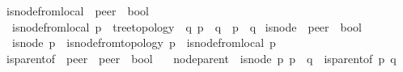 \begin{isabellebody}
\isanewline
{}\isamarkupfalse%
\ is{\isacharunderscore}{\kern0pt}node{\isacharunderscore}{\kern0pt}from{\isacharunderscore}{\kern0pt}local\ {\isacharcolon}{\kern0pt}{\isacharcolon}{\kern0pt}\ {\isachardoublequoteopen}{\isacharprime}{\kern0pt}peer\ {\isasymRightarrow}\ bool{\isachardoublequoteclose}\ \ \isanewline
\ \ {\isachardoublequoteopen}is{\isacharunderscore}{\kern0pt}node{\isacharunderscore}{\kern0pt}from{\isacharunderscore}{\kern0pt}local\ p\ {\isasymequiv}\ tree{\isacharunderscore}{\kern0pt}topology\ {\isasymand}\ {\isacharparenleft}{\kern0pt}{\isasymexists}q{\isachardot}{\kern0pt}\ {\isasymP}\isactrlsub {\isacharquery}{\kern0pt}{\isacharparenleft}{\kern0pt}p{\isacharparenright}{\kern0pt}\ {\isacharequal}{\kern0pt}\ {\isacharbraceleft}{\kern0pt}q{\isacharbraceright}{\kern0pt}\ {\isasymor}\ p\ {\isasymin}\ {\isasymP}\isactrlsub {\isacharbang}{\kern0pt}{\isacharparenleft}{\kern0pt}q{\isacharparenright}{\kern0pt}{\isacharparenright}{\kern0pt}{\isachardoublequoteclose}\isanewline
\isanewline
{}\isamarkupfalse%
\ is{\isacharunderscore}{\kern0pt}node\ {\isacharcolon}{\kern0pt}{\isacharcolon}{\kern0pt}\ {\isachardoublequoteopen}{\isacharprime}{\kern0pt}peer\ {\isasymRightarrow}\ bool{\isachardoublequoteclose}\ \ \isanewline
\ \ {\isachardoublequoteopen}is{\isacharunderscore}{\kern0pt}node\ p\ {\isasymequiv}\ is{\isacharunderscore}{\kern0pt}node{\isacharunderscore}{\kern0pt}from{\isacharunderscore}{\kern0pt}topology\ p\ {\isasymor}\ is{\isacharunderscore}{\kern0pt}node{\isacharunderscore}{\kern0pt}from{\isacharunderscore}{\kern0pt}local\ p{\isachardoublequoteclose}%
\isadelimdocument
%
\endisadelimdocument
%
\isatagdocument
%
\isamarkuptrue%
%
\endisatagdocument
{\isafolddocument}%
%
\isadelimdocument
%
\endisadelimdocument
{}\isamarkupfalse%
\ is{\isacharunderscore}{\kern0pt}parent{\isacharunderscore}{\kern0pt}of\ {\isacharcolon}{\kern0pt}{\isacharcolon}{\kern0pt}\ {\isachardoublequoteopen}{\isacharprime}{\kern0pt}peer\ {\isasymRightarrow}\ {\isacharprime}{\kern0pt}peer\ {\isasymRightarrow}\ bool{\isachardoublequoteclose}\ \isanewline
\ \ node{\isacharunderscore}{\kern0pt}parent\ {\isacharcolon}{\kern0pt}\ {\isachardoublequoteopen}{\isasymlbrakk}is{\isacharunderscore}{\kern0pt}node\ p{\isacharsemicolon}{\kern0pt}\ {\isasymG}{\isasymlangle}{\isasymrightarrow}p{\isasymrangle}\ {\isacharequal}{\kern0pt}\ {\isacharbraceleft}{\kern0pt}q{\isacharbraceright}{\kern0pt}{\isasymrbrakk}\ {\isasymLongrightarrow}\ is{\isacharunderscore}{\kern0pt}parent{\isacharunderscore}{\kern0pt}of\ p\ q{\isachardoublequoteclose}%

\end{isabellebody}
